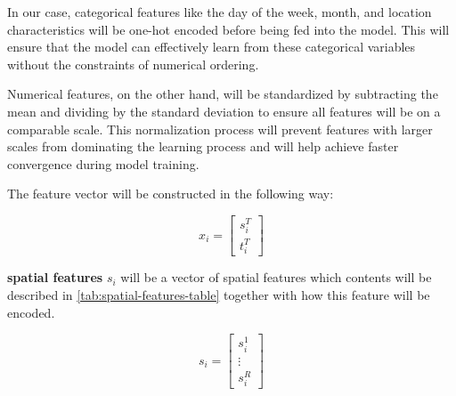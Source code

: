 
In our case, categorical features like the day of the week, month, and location characteristics will be one-hot encoded before being fed into the model. This will ensure that the model can effectively learn from these categorical variables without the constraints of numerical ordering.

Numerical features, on the other hand, will be standardized by subtracting the mean and dividing by the standard deviation to ensure all features will be on a comparable scale. This normalization process will prevent features with larger scales from dominating the learning process and will help achieve faster convergence during model training.

The feature vector will be constructed in the following way:

\begin{equation}
    \renewcommand*{\arraystretch}{1.5}
    x_i = \begin{bmatrix}
        s_i^T \\
        t_i^T
    \end{bmatrix}
\end{equation}

\textbf{spatial features} $s_i$ will be a vector of spatial features which contents will be described in \ref{tab:spatial-features-table} together with how this feature will be encoded.

\begin{equation}
    s_i = \begin{bmatrix}
        s_i^1  \\
        \vdots \\
        s_i^R
    \end{bmatrix}
\end{equation}

